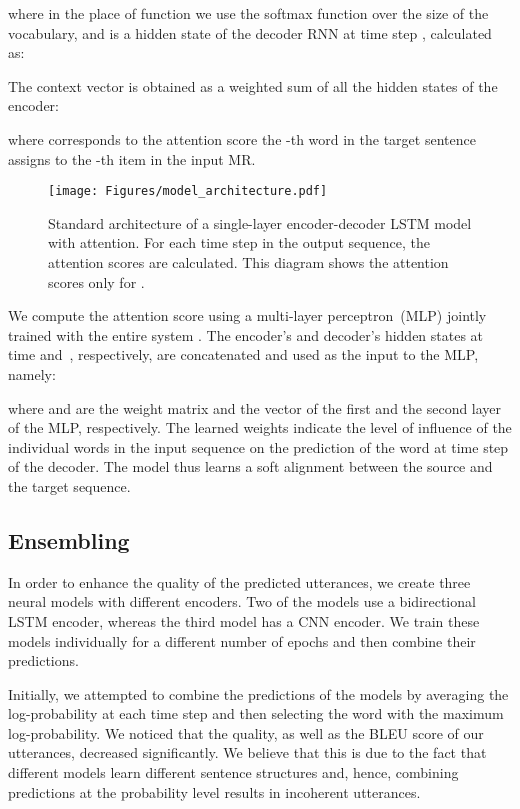 \documentclass[11pt,a4paper]{article}
\begin{document}
where in the place of function  we use the softmax function over the size of the vocabulary, and  is a hidden state of the decoder RNN at time step , calculated as:

The context vector  is obtained as a weighted sum of all the hidden states  of the encoder:

where  corresponds to the attention score the -th word in the target sentence assigns to the -th item in the input MR.

\begin{figure}
  \begin{center}
  	\texttt{[image: Figures/model\_architecture.pdf]}
  \end{center}
  \vspace{-0.4cm}
  \caption{Standard architecture of a single-layer encoder-decoder LSTM model with attention. For each time step  in the output sequence, the attention scores  are calculated. This diagram shows the attention scores only for .}
  \label{fig:enc_dec}
\end{figure}

We compute the attention score  using a multi-layer perceptron~(MLP) jointly trained with the entire system \cite{bahdanau2015neural}. The encoder's and decoder's hidden states at time  and~, respectively, are concatenated and used as the input to the MLP, namely:
 
where  and  are the weight matrix and the vector of the first and the second layer of the MLP, respectively. The learned weights indicate the level of influence of the individual words in the input sequence on the prediction of the word at time step  of the decoder. The model thus learns a soft alignment between the source and the target sequence.


\subsection{Ensembling}
\label{sec:ensembling}

In order to enhance the quality of the predicted utterances, we create three neural models with different encoders. Two of the models use a bidirectional LSTM \cite{hochreiter1997long} encoder, whereas the third model has a CNN \cite{lecun1998gradient} encoder. We train these models individually for a different number of epochs and then combine their predictions.

Initially, we attempted to combine the predictions of the models by averaging the log-probability at each time step and then selecting the word with the maximum log-probability. We noticed that the quality, as well as the BLEU score of our utterances, decreased significantly. We believe that this is due to the fact that different models learn different sentence structures and, hence, combining predictions at the probability level results in incoherent utterances.
\end{document}
